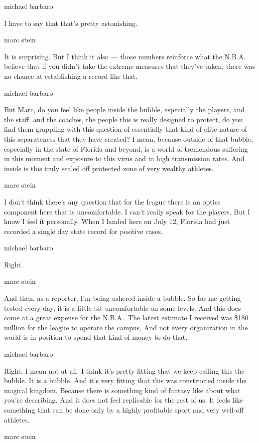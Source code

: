 michael barbaro

I have to say that that's pretty astonishing.

marc stein

It is surprising. But I think it also --- those numbers reinforce what
the N.B.A. believe that if you didn't take the extreme measures that
they've taken, there was no chance at establishing a record like that.

michael barbaro

But Marc, do you feel like people inside the bubble, especially the
players, and the staff, and the coaches, the people this is really
designed to protect, do you find them grappling with this question of
essentially that kind of elite nature of this separateness that they
have created? I mean, because outside of that bubble, especially in the
state of Florida and beyond, is a world of tremendous suffering in this
moment and exposure to this virus and in high transmission rates. And
inside is this truly sealed off protected zone of very wealthy athletes.

marc stein

I don't think there's any question that for the league there is an
optics component here that is uncomfortable. I can't really speak for
the players. But I know I feel it personally. When I landed here on July
12, Florida had just recorded a single day state record for positive
cases.

michael barbaro

Right.

marc stein

And then, as a reporter, I'm being ushered inside a bubble. So for me
getting tested every day, it is a little bit uncomfortable on some
levels. And this does come at a great expense for the N.B.A.. The latest
estimate I received was \$180 million for the league to operate the
campus. And not every organization in the world is in position to spend
that kind of money to do that.

michael barbaro

Right. I mean not at all. I think it's pretty fitting that we keep
calling this the bubble. It is a bubble. And it's very fitting that this
was constructed inside the magical kingdom. Because there is something
kind of fantasy like about what you're describing. And it does not feel
replicable for the rest of us. It feels like something that can be done
only by a highly profitable sport and very well-off athletes.

marc stein

